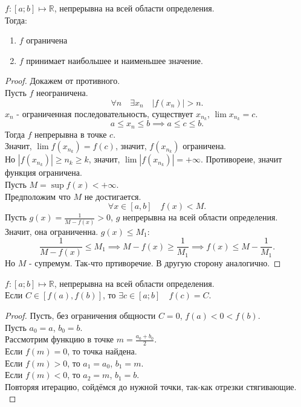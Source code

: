 \documentclass[11pt, oneside]{article}   	%
\begin{document}
    \begin{theorem}
        $f: \left[a; b\right] \mapsto \mathbb{R}$, непрерывна на всей области определения.\\
        Тогда:
        \begin{enumerate}
            \item $f$ ограничена
            \item $f$ принимает наибольшее и наименьшее значение.
        \end{enumerate}
        \begin{proof}
           Докажем от противного.\\
           Пусть $f$ неограничена.\\
           \[ \forall{n}\quad \exists{x_n}\quad |f(x_n)| > n .\]
           $x_n$ - ограниченная последовательность, существует $x _{n_k}$, $\lim x_{n_k} = c$.\\
           \[ a \le x_n \le b \implies a \le c \le b .\]
           Тогда $f$ непрерывна в точке $c$.\\
           Значит, $\lim f(x_{n_k}) = f(c) $, значит, $f(x_{n_k})$ ограничена.\\
           Но $|f(x_{n_k})| \ge n_k \ge k$, значит, $\lim |f(x_{n_k})| = +\infty$. Противореие, значит функция ограничена.\\
           Пусть $M = \sup f(x) < +\infty$.\\
           Предположим что $M$ не достигается.\\
           \[ \forall{x\in \left[a, b\right]}\quad f(x) < M .\]
           Пусть $g(x) = \frac{1}{M-f(x)} > 0$, $g$ непрерывна на всей области определения.\\
           Значит, она ограниченна. $g(x) \le M_1$:
           \[ \frac{1}{M-f(x)} \le M_1 \implies M - f(x) \ge \frac{1}{M_1} \implies f(x) \le M - \frac{1}{M_1} .\]
           Но $M$ - супремум. Так-что пртиворечие. В другую сторону аналогично.
        \end{proof}
    \end{theorem}
    \begin{theorem}
        $f: \left[a; b\right] \mapsto \mathbb{R}$, непрерывна на всей области определения.\\
        Если $C\in \left[f(a), f(b)\right]$, то $\exists{c\in \left[a; b\right]}\quad f(c)=C$.
        \begin{proof}
            Пусть, без ограничения общности $C=0$, $f(a)< 0 < f(b)$.\\
            Пусть $a_0 = a$, $b_0 = b$.\\
            Рассмотрим функцию в точке $m=\frac{a_0+b_0}{2}$.\\
            Если $f(m) = 0$, то точка найдена.\\
            Если $f(m) > 0$, то $a_1=a_0$, $b_1=m$.\\
            Если $f(m) < 0$, то $a_2=m$, $b_1=b$.\\
            Повторяя итерацию, сойдёмся до нужной точки, так-как отрезки стягивающие.\\
        \end{proof}
    \end{theorem}
\end{document}
